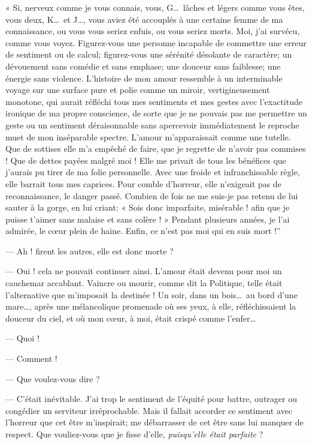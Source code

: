 « Si, nerveux comme je vous connais, vous, G\ldots\ lâches et légers comme
vous êtes, vous deux, K\ldots\ et J\ldots, vous aviez été accouplés à une
certaine femme de ma connaissance, ou vous vous seriez enfuis, ou vous
seriez morts. Moi, j’ai survécu, comme vous voyez.
Figurez{}-vous une personne incapable de commettre une erreur de
sentiment ou de calcul; figurez{}-vous une sérénité désolante de
caractère; un dévouement sans comédie et sans emphase; une douceur sans
faiblesse; une énergie sans violence. L’histoire de
mon amour ressemble à un interminable voyage sur une surface pure et
polie comme un miroir, vertigineusement monotone, qui aurait réfléchi
tous mes sentiments et mes gestes avec l’exactitude
ironique de ma propre conscience, de sorte que je ne pouvais pas me
permettre un geste ou un sentiment déraisonnable sans apercevoir
immédiatement le reproche muet de mon inséparable spectre.
L’amour m’apparaissait comme une
tutelle. Que de sottises elle m’a empêché de faire,
que je regrette de n’avoir pas commises ! Que de
dettes payées malgré moi ! Elle me privait de tous les bénéfices que
j’aurais pu tirer de ma folie personnelle. Avec une
froide et infranchissable règle, elle barrait tous mes caprices. Pour
comble d’horreur, elle n’exigeait pas
de reconnaissance, le danger passé. Combien de fois ne me suis{}-je pas
retenu de lui sauter à la gorge, en lui criant: « Sois donc imparfaite,
misérable ! afin que je puisse t’aimer sans malaise et
sans colère ! » Pendant plusieurs années, je l’ai
admirée, le c\oe ur plein de haine. Enfin, ce n’est pas
moi qui en suis mort !''

--- Ah ! firent les autres, elle est donc morte ?

--- Oui ! cela ne pouvait continuer ainsi. L’amour était
devenu pour moi un cauchemar accablant. Vaincre ou mourir, comme dit la
Politique, telle était l’alternative que
m’imposait la destinée ! Un soir, dans un bois\ldots\ au
bord d’une mare\ldots, après une mélancolique promenade
où ses yeux, à elle, réfléchissaient la douceur du ciel, et où mon
c\oe ur, à moi, était crispé comme l’enfer\ldots

--- Quoi !

--- Comment !

--- Que voulez{}-vous dire ?

--- C’était inévitable. J’ai trop le
sentiment de l’équité pour battre, outrager ou
congédier un serviteur irréprochable. Mais il fallait accorder ce
sentiment avec l’horreur que cet être
m’inspirait; me débarrasser de cet être sans lui
manquer de respect. Que vouliez{}-vous que je fisse
d’elle, \textit{puisqu’elle était parfaite} ?

